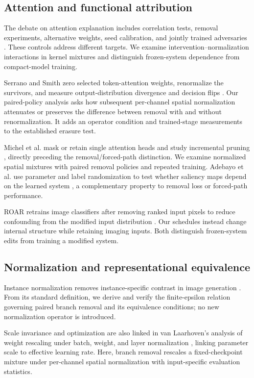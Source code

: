 \documentclass[mathematics,article,submit,pdftex,moreauthors]{Definitions/mdpi}
\begin{document}
\subsection{Attention and functional attribution}
The debate on attention explanation includes correlation tests, removal
experiments, alternative weights, seed calibration, and jointly trained
adversaries \cite{jain2019attention,serrano2019attention,wiegreffe2019attention}.
These controls address different targets. We examine intervention--normalization
interactions in kernel mixtures and distinguish frozen-system dependence
from compact-model training.

Serrano and Smith zero selected token-attention weights, renormalize the
survivors, and measure output-distribution divergence and decision flips
\cite{serrano2019attention}. Our paired-policy analysis asks how subsequent
per-channel spatial normalization attenuates or preserves the difference
between removal with and without renormalization. It adds an operator
condition and trained-stage measurements to the established erasure test.

Michel et al. mask or retain single attention heads and study incremental
pruning \cite{michel2019heads}, directly preceding the removal/forced-path
distinction. We examine normalized spatial mixtures with paired removal
policies and repeated training.
Adebayo et al. use parameter and label randomization to test whether saliency
maps depend on the learned system \cite{adebayo2018sanity}, a complementary
property to removal loss or forced-path performance.

ROAR retrains image classifiers after removing ranked input pixels to reduce
confounding from the modified input distribution \cite{hooker2019roar}.
Our schedules instead change internal structure while retaining imaging
inputs. Both distinguish frozen-system edits from training a modified system.

\subsection{Normalization and representational equivalence}
Instance normalization removes instance-specific contrast in image generation
\cite{ulyanov2016instance}. From its standard definition, we derive and
verify the finite-epsilon relation governing paired branch removal and its
equivalence conditions; no new normalization operator is introduced.

Scale invariance and optimization are also linked in van Laarhoven's analysis
of weight rescaling under batch, weight, and layer normalization
\cite{vanlaarhoven2017normalization}, linking parameter scale to effective
learning rate. Here, branch removal rescales a fixed-checkpoint mixture under
per-channel spatial normalization with input-specific evaluation statistics.
\end{document}
